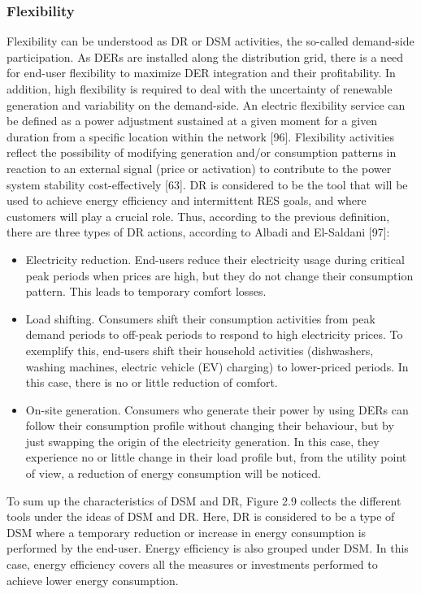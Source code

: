 \subsubsection{Flexibility}
Flexibility can be understood as DR or DSM activities, the so-called demand-side participation. As DERs are installed along the distribution grid, there is a need for end-user flexibility to maximize DER integration and their profitability. In addition, high flexibility is required to deal with the uncertainty of renewable generation and variability on the demand-side. An electric flexibility service can be defined as a power adjustment sustained at a given moment for a given duration from a specific location within the network [96]. Flexibility activities reflect the possibility of modifying generation and/or consumption patterns in reaction to an external signal (price or activation) to contribute to the power system stability cost-effectively [63]. DR is considered to be the tool that will be used to achieve energy efficiency and intermittent RES goals, and where customers will 
play a crucial role. Thus, according to the previous definition, there are three types of DR actions, according to Albadi and El-Saldani [97]:

\begin{itemize}
\item Electricity reduction. End-users reduce their electricity usage during critical peak periods when prices are
high, but they do not change their consumption pattern. This leads to temporary comfort losses. 
\item Load shifting. Consumers shift their consumption activities from peak demand periods to off-peak periods to respond to high electricity prices. To exemplify this, end-users shift their household activities (dishwashers, washing machines, electric vehicle (EV) charging) to lower-priced periods. In this case, there is no or little reduction of comfort. 
\item On-site generation. Consumers who generate their power by using DERs can follow their consumption profile without changing their behaviour, but by just swapping the origin of the electricity generation. In this case, they experience no or little change in their load profile but, from the utility point of view, a reduction of energy consumption will be noticed.
\end{itemize}

To sum up the characteristics of DSM and DR, Figure 2.9 collects the different tools under the ideas of DSM and DR. Here, DR is considered to be a type of DSM where a temporary reduction or increase in energy consumption is performed by the end-user. Energy efficiency is also grouped under DSM. In this case, energy efficiency covers all the measures or investments performed to achieve lower energy consumption.

